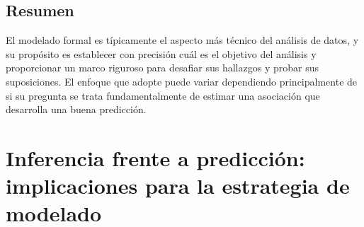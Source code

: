 \documentclass[10pt]{book}
\begin{document}
    \section{Resumen}
    El modelado formal es típicamente el aspecto más técnico del análisis de datos, y su propósito es establecer con precisión cuál es el objetivo del análisis y proporcionar un marco riguroso para desafiar sus hallazgos y probar sus suposiciones. El enfoque que adopte puede variar dependiendo principalmente de si su pregunta se trata fundamentalmente de estimar una asociación que desarrolla una buena predicción.

\chapter{Inferencia frente a predicción: implicaciones para la estrategia de modelado}
\end{document}

